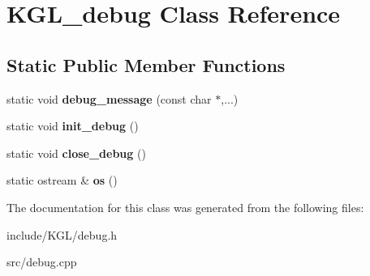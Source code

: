 \hypertarget{class_k_g_l__debug}{}\section{K\+G\+L\+\_\+debug Class Reference}
\label{class_k_g_l__debug}
\subsection*{Static Public Member Functions}
\begin{DoxyCompactItemize}
\item 
\mbox{\label{class_k_g_l__debug_a7cbf4cf6277600c38582f45fa55935ae}} 
static void {\bfseries debug\+\_\+message} (const char $\ast$,...)
\item 
\mbox{\label{class_k_g_l__debug_afaf31f8cabc48df97b2b66c8fe419f11}} 
static void {\bfseries init\+\_\+debug} ()
\item 
\mbox{\label{class_k_g_l__debug_ab039ff52c2a2cf31e4c3e15800e80186}} 
static void {\bfseries close\+\_\+debug} ()
\item 
\mbox{\label{class_k_g_l__debug_a4387b8239448fb5a710633fcde7a2164}} 
static ostream \& {\bfseries os} ()
\end{DoxyCompactItemize}


The documentation for this class was generated from the following files\+:\begin{DoxyCompactItemize}
\item 
include/\+K\+G\+L/debug.\+h\item 
src/debug.\+cpp\end{DoxyCompactItemize}
